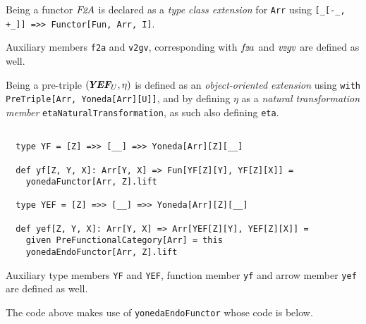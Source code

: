 \documentclass[11pt]{article}
\newcommand{\YEF}{\mbox{\bf {\em YEF}}}
\newcommand{\FTA}{\mbox{$F$\!{\small {\em 2}}$A$}}
\newcommand{\fta}{\mbox{$f$\!{\scriptsize {\em 2}}$a$}}
\newcommand{\vtgv}{\mbox{{\normalsize {\em v}}{\scriptsize {\em 2}}{\normalsize {\em gv}}}}
\def\edefn{\endgroup\par\pagebreak[2]\addvspace{\medskipamount}}
\let\ecode=\edefn
\begin{document}
Being a functor $\FTA$ is declared as a {\em type class extension} for {\tt Arr} using 
{\tt [\_[-\_, +\_]] =>> Functor[Fun, Arr, I]}.

Auxiliary members {\tt f2a} and {\tt v2gv}, corresponding with $\fta$ and $\vtgv$ are defined as well. 

Being a pre-triple $(\!\YEF_{U},\eta)$ is defined as an {\em object-oriented extension} using  
{\tt with PreTriple[Arr, Yoneda[Arr][U]]}, and by defining
$\eta$ as a {\em natural transformation member} {\tt etaNaturalTransformation}, as such also defining {\tt eta}.

\vspace{6pt}
\begin{mdframed}[backgroundcolor=lightgray!20] 
\begin{lstlisting}
  
  type YF = [Z] =>> [__] =>> Yoneda[Arr][Z][__]

  def yf[Z, Y, X]: Arr[Y, X] => Fun[YF[Z][Y], YF[Z][X]] =
    yonedaFunctor[Arr, Z].lift

  type YEF = [Z] =>> [__] =>> Yoneda[Arr][Z][__]

  def yef[Z, Y, X]: Arr[Y, X] => Arr[YEF[Z][Y], YEF[Z][X]] =
    given PreFunctionalCategory[Arr] = this
    yonedaEndoFunctor[Arr, Z].lift
\end{lstlisting}
\end{mdframed}
\ecode

Auxiliary type members {\tt YF} and {\tt YEF}, function member {\tt yf} and arrow member {\tt yef} are defined as well.

The code above makes use of {\tt yonedaEndoFunctor} whose code is below.
\end{document}
